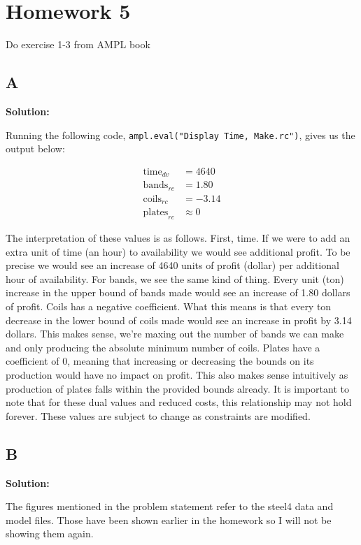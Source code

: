\section*{Homework 5}

Do exercise 1-3 from AMPL book

\subsection*{A}

\noindent\textbf{Solution:}

Running the following code, \texttt{ampl.eval("Display Time, Make.rc")}, gives us the output below:

\begin{align*}
	\text{time}_{dv} &= 4640 \\
	\text{bands}_{rc} &= 1.80 \\
	\text{coils}_{rc} &= -3.14 \\
	\text{plates}_{rc} &\approx 0
\end{align*}

The interpretation of these values is as follows. First, time. If we were to add an extra unit of time (an hour) to availability we would see additional profit. To be precise we would see an increase of 4640 units of profit (dollar) per additional hour of availability. For bands, we see the same kind of thing. Every unit (ton) increase in the upper bound of bands made would see an increase of 1.80 dollars of profit. Coils has a negative coefficient. What this means is that every ton decrease in the lower bound of coils made would see an increase in profit by 3.14 dollars. This makes sense, we're maxing out the number of bands we can make and only producing the absolute minimum number of coils. Plates have a coefficient of 0, meaning that increasing or decreasing the bounds on its production would have no impact on profit. This also makes sense intuitively as production of plates falls within the provided bounds already. It is important to note that for these dual values and reduced costs, this relationship may not hold forever. These values are subject to change as constraints are modified.

\subsection*{B}

\noindent\textbf{Solution:}

The figures mentioned in the problem statement refer to the steel4 data and model files. Those have been shown earlier in the homework so I will not be showing them again. 

